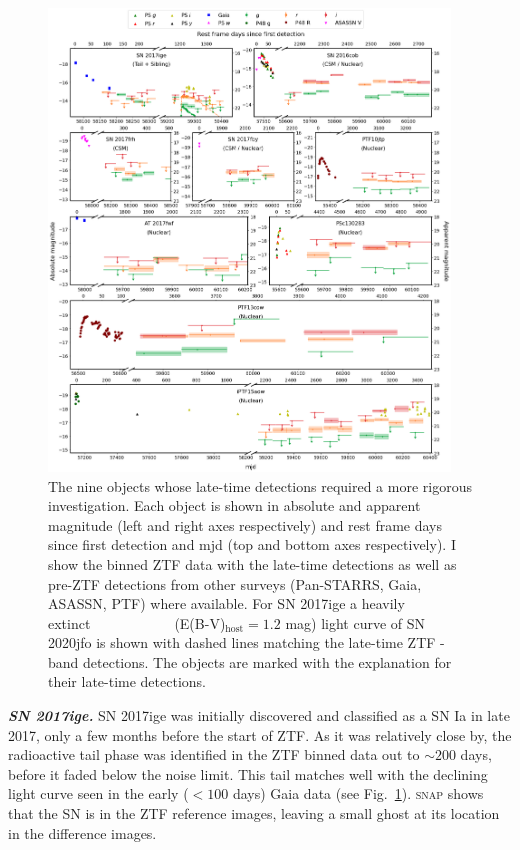 \documentclass[a4paper,oneside,12pt, class=Latex/Classes/PhDthesisPSnPDF, crop=false]{standalone}
\begin{document}
\begin{figure}
    \centering
    \includegraphics[width=0.95\textwidth]{../Images/chapter_4/weirdos.png}
    \caption{The nine objects whose late-time detections required a more rigorous investigation. Each object is shown in absolute and apparent magnitude (left and right axes respectively) and rest frame days since first detection and mjd (top and bottom axes respectively). I show the binned ZTF data with the late-time detections as well as pre-ZTF detections from other surveys (Pan-STARRS, Gaia, ASASSN, PTF) where available. For SN 2017ige a heavily extinct\ \ \ \ \ \ \ \ \ \ \ \ (E(B-V)$_\text{host}=1.2$ mag) light curve of SN 2020jfo is shown with dashed lines matching the late-time ZTF \ztfr-band detections. The objects are marked with the explanation for their late-time detections.}
    \label{weirdo_plots}
\end{figure}


\textit{\textbf{SN 2017ige.}}
SN 2017ige was initially discovered and classified as a SN Ia in late 2017, only a few months before the start of ZTF. As it was relatively close by, the radioactive tail phase was identified in the ZTF binned data out to $\sim200$ days, before it faded below the noise limit. This tail matches well with the declining light curve seen in the early ($<100$ days) Gaia data (see Fig.~\ref{weirdo_plots}). \textsc{snap} shows that the SN is in the ZTF reference images, leaving a small ghost at its location in the difference images.
\end{document}
